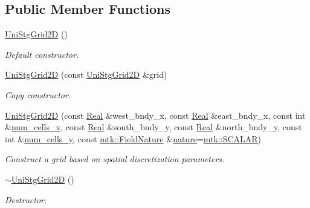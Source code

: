 \subsection*{Public Member Functions}
\begin{DoxyCompactItemize}
\item 
\hyperlink{classmtk_1_1UniStgGrid2D_a40db9a6d21e0f4cf70c478fcc3b94531}{Uni\+Stg\+Grid2\+D} ()
\begin{DoxyCompactList}\small\item\em Default constructor. \end{DoxyCompactList}\item 
\hyperlink{classmtk_1_1UniStgGrid2D_aab6e54b48c3f32de808460ef46f598d4}{Uni\+Stg\+Grid2\+D} (const \hyperlink{classmtk_1_1UniStgGrid2D}{Uni\+Stg\+Grid2\+D} \&grid)
\begin{DoxyCompactList}\small\item\em Copy constructor. \end{DoxyCompactList}\item 
\hyperlink{classmtk_1_1UniStgGrid2D_ad8813b1ffcf23bb759f59f8524702e80}{Uni\+Stg\+Grid2\+D} (const \hyperlink{group__c01-roots_gac080bbbf5cbb5502c9f00405f894857d}{Real} \&west\+\_\+bndy\+\_\+x, const \hyperlink{group__c01-roots_gac080bbbf5cbb5502c9f00405f894857d}{Real} \&east\+\_\+bndy\+\_\+x, const int \&\hyperlink{classmtk_1_1UniStgGrid2D_a2d182866a398aba8e4829590e85bf939}{num\+\_\+cells\+\_\+x}, const \hyperlink{group__c01-roots_gac080bbbf5cbb5502c9f00405f894857d}{Real} \&south\+\_\+bndy\+\_\+y, const \hyperlink{group__c01-roots_gac080bbbf5cbb5502c9f00405f894857d}{Real} \&north\+\_\+bndy\+\_\+y, const int \&\hyperlink{classmtk_1_1UniStgGrid2D_aed05a801cc9a76dba0ff203cea58a61a}{num\+\_\+cells\+\_\+y}, const \hyperlink{group__c02-enums_ga4c54f2a329cfb4e56213b02a259d19e2}{mtk\+::\+Field\+Nature} \&\hyperlink{classmtk_1_1UniStgGrid2D_a99a3a9cdb05b7306be99bde935509e30}{nature}=\hyperlink{namespacemtk_ga4c54f2a329cfb4e56213b02a259d19e2af481d45bd70d41381c7d72e200889205}{mtk\+::\+S\+C\+A\+L\+A\+R})
\begin{DoxyCompactList}\small\item\em Construct a grid based on spatial discretization parameters. \end{DoxyCompactList}\item 
\hyperlink{classmtk_1_1UniStgGrid2D_a55615fed9674be8d8a48a1105e5a1476}{$\sim$\+Uni\+Stg\+Grid2\+D} ()
\begin{DoxyCompactList}\small\item\em Destructor. \end{DoxyCompactList}\item 

\end{DoxyCompactItemize}
